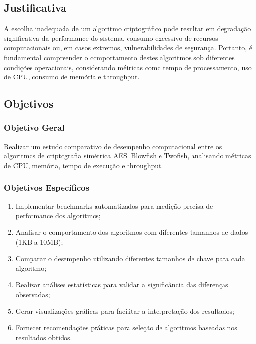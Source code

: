 \documentclass[12pt,a4paper,oneside]{article}
\begin{document}
\subsection{Justificativa}

A escolha inadequada de um algoritmo criptográfico pode resultar em degradação significativa da performance do sistema, consumo excessivo de recursos computacionais ou, em casos extremos, vulnerabilidades de segurança. Portanto, é fundamental compreender o comportamento destes algoritmos sob diferentes condições operacionais, considerando métricas como tempo de processamento, uso de CPU, consumo de memória e throughput.

\subsection{Objetivos}

\subsubsection{Objetivo Geral}

Realizar um estudo comparativo de desempenho computacional entre os algoritmos de criptografia simétrica AES, Blowfish e Twofish, analisando métricas de CPU, memória, tempo de execução e throughput.

\subsubsection{Objetivos Específicos}

\begin{enumerate}
    \item Implementar benchmarks automatizados para medição precisa de performance dos algoritmos;
    \item Analisar o comportamento dos algoritmos com diferentes tamanhos de dados (1KB a 10MB);
    \item Comparar o desempenho utilizando diferentes tamanhos de chave para cada algoritmo;
    \item Realizar análises estatísticas para validar a significância das diferenças observadas;
    \item Gerar visualizações gráficas para facilitar a interpretação dos resultados;
    \item Fornecer recomendações práticas para seleção de algoritmos baseadas nos resultados obtidos.
\end{enumerate}

\end{document}
